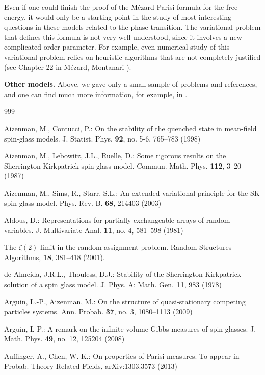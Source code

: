 \documentclass[12pt]{article}
\theoremstyle{nonumberplain}
\begin{document}
Even if one could finish the proof of the M\'ezard-Parisi formula for the free energy, it would only be a starting point in the study of most interesting questions in these models related to the phase transition. The variational problem that defines this formula is not very well understood, since it involves a new complicated order parameter. For example, even numerical study of this variational problem relies on heuristic algorithms that are not completely justified (see Chapter 22 in M\'ezard, Montanari \cite{MezMont}). 

\medskip
\noindent
\textbf{Other models.} Above, we gave only a small sample of problems and references, and one can find much more information, for example, in \cite{SG2, SG2-2, NS, MezMont}.



\begin{thebibliography}{999}


 Aizenman, M., Contucci, P.: On the stability of the quenched state in mean-field spin-glass models. J. Statist. Phys. \textbf{92}, no. 5-6, 765--783 (1998)

 Aizenman, M.,  Lebowitz, J.L., Ruelle, D.: Some rigorous results on the Sherrington-Kirkpatrick spin glass model. Commun. Math. Phys. \textbf{112}, 3--20 (1987) 

 Aizenman, M., Sims, R., Starr, S.L.: An extended variational principle for the SK spin-glass model. Phys. Rev. B. \textbf{68}, 214403 (2003)

 Aldous, D.: Representations for partially exchangeable arrays of random variables.   J. Multivariate Anal.  \textbf{11}, no. 4, 581--598 (1981) 

 The $\zeta(2)$ limit in the random assignment problem. Random Structures Algorithms, \textbf{18}, 381--418 (2001).

 de Almeida, J.R.L., Thouless, D.J.: Stability of the Sherrington-Kirkpatrick solution of a spin glass model. J. Phys. A: Math. Gen. \textbf{11}, 983 (1978)

 Arguin, L.-P., Aizenman, M.: On the structure of quasi-stationary competing particles systems. Ann. Probab. \textbf{37}, no. 3, 1080--1113 (2009)

 Arguin, L-P.: A remark on the infinite-volume Gibbs measures of spin glasses. J. Math. Phys. \textbf{49}, no. 12, 125204 (2008) 

 Auffinger, A., Chen, W.-K.: On properties of Parisi measures. To appear in Probab. Theory Related Fields, arXiv:1303.3573 (2013)


\end{thebibliography}
\end{document}

